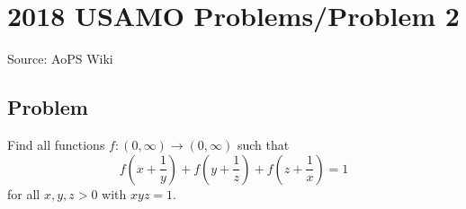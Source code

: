 \documentclass[12pt]{article}
\begin{document}
\section*{{2018 USAMO Problems/Problem 2}}
Source: AoPS Wiki

\subsection*{Problem}
Find all functions $f:(0,\infty) \to (0,\infty)$ such that \[f\left(x+\frac{1}{y}\right)+f\left(y+\frac{1}{z}\right) + f\left(z+\frac{1}{x}\right) = 1\] for all $x,y,z >0$ with $xyz =1.$
\end{document}
